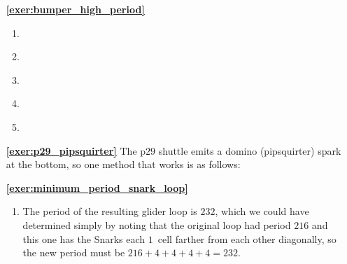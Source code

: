 \begin{multicols}{2}
	\begin{itemize}[leftmargin=0em]
		\item[\bf\color{ocre}\sffamily\ref{exer:bumper_high_period}]
		\begin{enumerate}[leftmargin=1.5em,label=\bf\color{ocre}(\alph*)]
			\item {} \\
			
			\item {} \\
			
			\item {} \\
			
			\item {} \\
			
			\item {} \\
		\end{enumerate}
		
		
		\item[\bf\color{ocre}\sffamily\ref{exer:p29_pipsquirter}] The p$29$ shuttle emits a domino (pipsquirter) spark at the bottom, so one method that works is as follows:
		
		\begin{center}
		\end{center}
		
		
		\item[\bf\color{ocre}\sffamily\ref{exer:minimum_period_snark_loop}]
		\begin{enumerate}[leftmargin=1.5em,label=\bf\color{ocre}(\alph*)]
			\item The period of the resulting glider loop is $232$, which we could have determined simply by noting that the original loop had period $216$ and this one has the Snarks each $1$~cell farther from each other diagonally, so the new period must be $216+4+4+4+4 = 232$.
			
			\noindent\begin{center}
			\end{center}
		

\end{enumerate}
\end{itemize}
\end{multicols}
